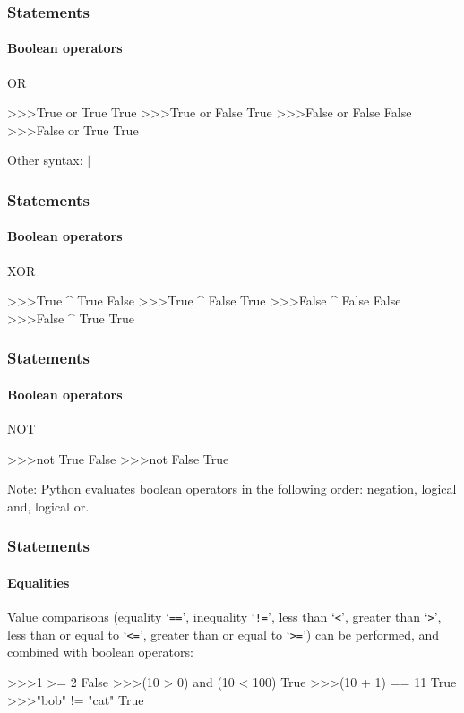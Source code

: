 \documentclass[handout]{beamer}
\def\prompt{>\hspace{-1pt}>\hspace{-1pt}>\/}
\begin{document}
\begin{frame}[fragile]
	\frametitle{Statements}
	\framesubtitle{Boolean operators}

	\begin{block}{OR}
		\begin{semiverbatim}
			\prompt True or True
			True
			\prompt True or False
			True
			\prompt False or False
			False
			\prompt False or True
			True
		\end{semiverbatim}

		Other syntax: $|$
	\end{block}
\end{frame}

\begin{frame}[fragile]
	\frametitle{Statements}
	\framesubtitle{Boolean operators}

	\begin{block}{XOR}
		\begin{semiverbatim}
			\prompt True ^ True
			False
			\prompt True ^ False
			True
			\prompt False ^ False
			False
			\prompt False ^ True
			True
		\end{semiverbatim}
	\end{block}
\end{frame}

\begin{frame}[fragile]
	\frametitle{Statements}
	\framesubtitle{Boolean operators}

	\begin{block}{NOT}
		\begin{semiverbatim}
			\prompt not True
			False
			\prompt not False
			True
		\end{semiverbatim}
	\end{block}

	Note: Python evaluates boolean operators in the following order: negation, logical and, logical or.
\end{frame}

\begin{frame}[fragile]
	\frametitle{Statements}
	\framesubtitle{Equalities}

	Value comparisons (equality `\texttt{==}', inequality `\texttt{!=}', less than `\texttt{<}', greater than `\texttt{>}', less than or equal to `\texttt{<=}', greater than or equal to `\texttt{>=}') can be performed, and combined with boolean operators:

	\begin{semiverbatim}
		\prompt 1 >= 2
		False
		\prompt (10 > 0) and (10 < 100)
		True
		\prompt (10 + 1) == 11
		True
		\prompt "bob" != "cat"
		True
	\end{semiverbatim}
\end{frame}
\end{document}
